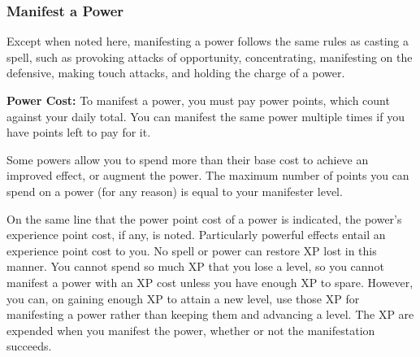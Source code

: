 \subsubsection{Manifest a Power}
Except when noted here, manifesting a power follows the same rules as casting a spell, such as provoking attacks of opportunity, concentrating, manifesting on the defensive, making touch attacks, and holding the charge of a power.

\textbf{Power Cost:} To manifest a power, you must pay power points, which count against your daily total. You can manifest the same power multiple times if you have points left to pay for it.

Some powers allow you to spend more than their base cost to achieve an improved effect, or augment the power. The maximum number of points you can spend on a power (for any reason) is equal to your manifester level.

On the same line that the power point cost of a power is indicated, the power's experience point cost, if any, is noted. Particularly powerful effects entail an experience point cost to you. No spell or power can restore XP lost in this manner. You cannot spend so much XP that you lose a level, so you cannot manifest a power with an XP cost unless you have enough XP to spare. However, you can, on gaining enough XP to attain a new level, use those XP for manifesting a power rather than keeping them and advancing a level. The XP are expended when you manifest the power, whether or not the manifestation succeeds.
